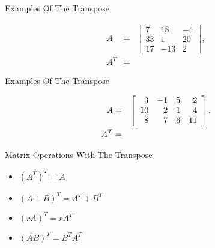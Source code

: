 \documentclass[svgnames,table,,aspectratio=169]{beamer}
\newcommand{\dotfield}[2]{%
  \begin{tikzpicture}[y=0.25cm, x=0.25cm,font=\sffamily]
    \foreach \y in {0,...,#2} {
      \foreach \x in {0,...,#1} {
        \draw[fill=georgiaRed,opacity=0.1] (\x,\y)  circle [radius=0.03em];
      }
    }
  \end{tikzpicture}
}
\newcommand{\threeByThree}[9]{
  \left[
    \begin{array}{rrr}
      #1 & #2 & #3 \\
      #4 & #5 & #6 \\
      #7 & #8 & #9
    \end{array}
  \right]
}
\begin{document}
\begin{frame}{Examples Of The Transpose}

  \begin{eqnarray*}
    A & = & \threeByThree{7}{18}{-4}{33}{1}{20}{17}{-13}{2}, \\
    A^T & = & 
  \end{eqnarray*}
  
\end{frame}

\begin{frame}{Examples Of The Transpose}

  \begin{eqnarray*}
    A & = & \threeRows{%
            \rowFour{3}{-1}{5}{2}}{%
            \rowFour{10}{2}{1}{4}}{%
            \rowFour{8}{7}{6}{11}}, \\
    A^T & = & 
  \end{eqnarray*}
  
\end{frame}

\begin{frame}{Matrix Operations With The Transpose}

  \begin{itemize}
  \item $\left(A^T\right)^T = A$
  \item $\left(A+B\right)^T = A^T + B^T$
  \item $\left(rA\right)^T = rA^T$
  \item $\left(AB\right)^T = B^T A^T$
  \end{itemize}
  
\end{frame}

\end{document}
